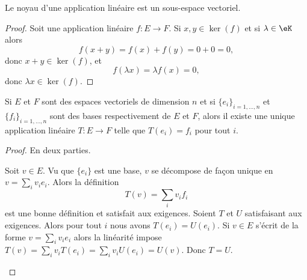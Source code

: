 \begin{proposition}     \label{PROPooRLLPooKYzsJp}
	Le noyau d'une application linéaire est un sous-espace vectoriel.
\end{proposition}

\begin{proof}
	Soit une application linéaire \( f\colon E\to F\). Si \( x,y\in \ker(f)\) et si \( \lambda\in \eK\) alors
	\begin{equation}
		f(x+y)=f(x)+f(y)=0+0=0,
	\end{equation}
	donc \( x+y\in \ker(f)\), et
	\begin{equation}
		f(\lambda x)=\lambda f(x)=0,
	\end{equation}
	donc \( \lambda x\in \ker(f)\).
\end{proof}

\begin{proposition}
	Si \( E\) et \( F\) sont des espaces vectoriels de dimension \( n\) et si \( \{ e_i \}_{i=1,\ldots, n}\) et \( \{ f_i \}_{i=1,\ldots, n}\) sont des bases respectivement de \( E\) et \( F\), alors il existe une unique application linéaire \( T\colon E\to F\) telle que \( T(e_i)=f_i\) pour tout \( i\).
\end{proposition}

\begin{proof}
	En deux parties.\begin{subproof}
		\spitem[Existence]
		Soit \( v\in E\). Vu que \( \{ e_i \}\) est une base, \( v\) se décompose de façon unique en \( v=\sum_iv_ie_i\). Alors la définition
		\begin{equation}
			T(v)=\sum_iv_if_i
		\end{equation}
		est une bonne définition et satisfait aux exigences.
		\spitem[Unicité]
		Soient \( T\) et \( U\) satisfaisant aux exigences. Alors pour tout \( i\) nous avons \( T(e_i)=U(e_i)\). Si \( v\in E\) s'écrit de la forme \( v=\sum_iv_ie_i\) alors la linéarité impose \( T(v)=\sum_iv_iT(e_i)=\sum_iv_iU(e_i)=U(v)\). Donc \( T = U\).
	\end{subproof}
\end{proof}

